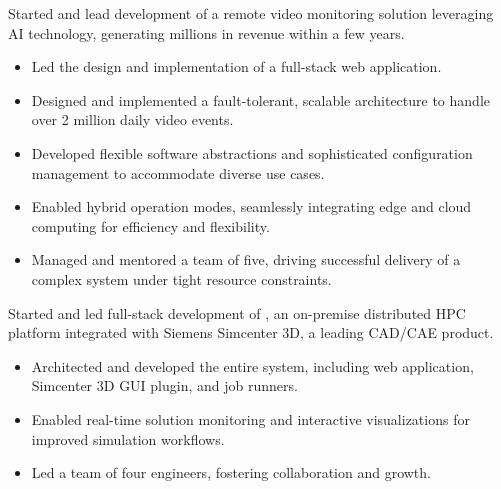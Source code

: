 \documentclass{mycv}
\begin{document}
\begin{sectionindent}

    Started and lead development of a remote video monitoring solution leveraging AI technology, generating millions in revenue within a few years.

    \begin{itemize}
        \item Led the design and implementation of a full-stack web application.
        \item Designed and implemented a fault-tolerant, scalable architecture to handle over 2 million daily video events.
        \item Developed flexible software abstractions and sophisticated configuration management to accommodate diverse use cases.
        \item Enabled hybrid operation modes, seamlessly integrating edge and cloud computing for efficiency and flexibility.
        \item Managed and mentored a team of five, driving successful delivery of a complex system under tight resource constraints.
    \end{itemize}


    \vspace{2\parskip}


    Started and led full-stack development of \href{https://blogs.sw.siemens.com/simcenter/simcenter-3d-2022-1-remote-solve/}{}, an on-premise distributed HPC platform integrated with Siemens Simcenter 3D, a leading CAD/CAE product.

    \begin{itemize}
        \item Architected and developed the entire system, including web application, Simcenter 3D GUI plugin, and job runners.
        \item Enabled real-time solution monitoring and interactive visualizations for improved simulation workflows.
        \item Led a team of four engineers, fostering collaboration and growth.
    \end{itemize}


\end{sectionindent}
\end{document}
